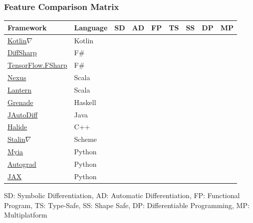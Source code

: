 \documentclass{beamer}
\newcommand{\wmark}{\textcolor{orange}{\ding{45}}}
\newcommand{\cmark}{\textcolor{green!80!black}{\ding{51}}}
\newcommand{\xmark}{\textcolor{red}{\ding{55}}}
\begin{document}
    \begin{frame}
        \frametitle{Feature Comparison Matrix}
            \begin{center}
            \begin{tabular}{lllllllll}
            \textbf{Framework} & \textbf{Language}  & SD     & AD     & FP     & TS     & SS     & DP     & MP     \\ \hline
            \href{https://github.com/breandan/kotlingrad}{Kotlin$\nabla$}                    & Kotlin  & \cmark & \cmark & \cmark & \cmark & \cmark & \wmark & \wmark \\
            \href{http://diffsharp.github.io/DiffSharp/}{DiffSharp}                          & F\#     & \xmark & \cmark & \cmark & \cmark & \xmark & \cmark & \xmark \\
            \href{https://github.com/fsprojects/fsharp-ai-tools}{TensorFlow.FSharp}          & F\#     & \xmark & \cmark & \cmark & \cmark & \cmark & \cmark & \xmark \\
            \href{https://tongfei.me/nexus/}{Nexus}                                          & Scala   & \xmark & \cmark & \cmark & \cmark & \cmark & \cmark & \xmark \\
            \href{https://feiwang3311.github.io/Lantern/}{Lantern}                           & Scala   & \xmark & \cmark & \cmark & \cmark & \xmark & \cmark & \xmark \\
            \href{https://github.com/HuwCampbell/grenade}{Grenade}                           & Haskell & \xmark & \cmark & \cmark & \cmark & \cmark & \xmark & \xmark \\
            \href{http://uniker9.github.io/JAutoDiff/}{JAutoDiff}                            & Java    & \cmark & \cmark & \xmark & \cmark & \xmark & \xmark & \xmark \\
            \href{https://halide-lang.org}{Halide}                                           & C++     & \xmark & \cmark & \xmark & \cmark & \xmark & \cmark & \xmark \\
            \href{https://github.com/Functional-AutoDiff/STALINGRAD}{Stalin$\nabla$}         & Scheme  & \xmark & \cmark & \xmark & \xmark & \xmark & \xmark & \xmark \\
            \href{https://github.com/mila-iqia/myia}{Myia}                                   & Python  & \cmark & \cmark & \cmark & \xmark & \xmark & \cmark & \wmark \\
            \href{https://github.com/HIPS/autograd/}{Autograd}                               & Python  & \xmark & \cmark & \xmark & \xmark & \xmark & \xmark & \xmark \\
            \href{https://github.com/google/jax}{JAX}                                        & Python  & \xmark & \cmark & \cmark & \xmark & \xmark & \cmark & \wmark \\
        \end{tabular}
        \end{center}
        \footnotesize{SD: Symbolic Differentiation, AD: Automatic Differentiation, FP: Functional Program, TS: Type-Safe, SS: Shape Safe, DP: Differentiable Programming, MP: Multiplatform}
    \end{frame}
\end{document}
